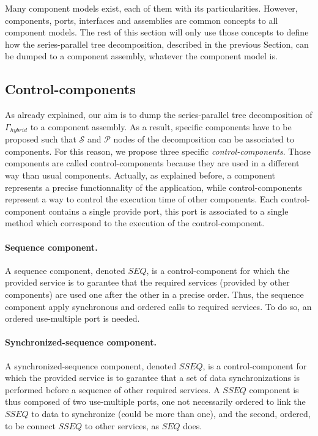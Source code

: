 Many component models exist, each of them with its particularities. However, components, ports, interfaces and assemblies are common concepts to all component models. The rest of this section will only use those concepts to define how the series-parallel tree decomposition, described in the previous Section, can be dumped to a component assembly, whatever the component model is.

\subsection{Control-components}
As already explained, our aim is to dump the series-parallel tree decomposition of $\Gamma_{hybrid}$ to a component assembly. As a result, specific components have to be proposed such that $\mathcal{S}$ and $\mathcal{P}$ nodes of the decomposition can be associated to components. For this reason, we propose three specific \emph{control-components}. Those components are called control-components because they are used in a different way than usual components. Actually, as explained before, a component represents a precise functionnality of the application, while control-components represent a way to control the execution time of other components. Each control-component contains a single provide port, this port is associated to a single method which correspond to the execution of the control-component.

\paragraph{Sequence component.} A sequence component, denoted $SEQ$, is a control-component for which the provided service is to garantee that the required services (provided by other components) are used one after the other in a precise order. Thus, the sequence component apply synchronous and ordered calls to required services. To do so, an ordered use-multiple port is needed.

\paragraph{Synchronized-sequence component.} A synchronized-sequence component, denoted $SSEQ$, is a control-component for which the provided service is to garantee that a set of data synchronizations is performed before a sequence of other required services. A $SSEQ$ component is thus composed of two use-multiple ports, one not necessarily ordered to link the $SSEQ$ to data to synchronize (could be more than one), and the second, ordered, to be connect $SSEQ$ to other services, as $SEQ$ does.

